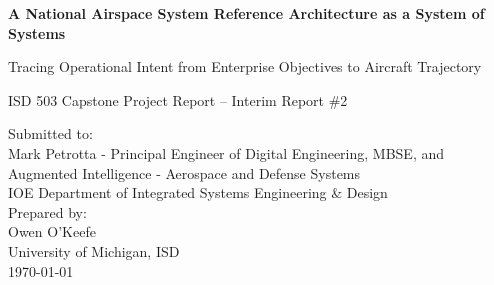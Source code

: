 \begin{titlepage}
\centering
\vspace*{2cm}
{\LARGE \textbf{A National Airspace System Reference Architecture as a System of Systems} \par}
\vspace{0.5cm}
{\Large Tracing Operational Intent from Enterprise Objectives to Aircraft Trajectory \par}
\vspace{1cm}
{\large ISD 503 Capstone Project Report -- Interim Report \#2 \par}
\vspace{2cm}

\begin{flushleft}
Submitted to: \\
Mark Petrotta - Principal Engineer of Digital Engineering, MBSE, and Augmented Intelligence - Aerospace and Defense Systems \\
IOE Department of Integrated Systems Engineering \& Design \\[1em]

Prepared by: \\
Owen O'Keefe \\
University of Michigan, ISD \\[1em]

\today
\end{flushleft}


\vfill
\end{titlepage}

